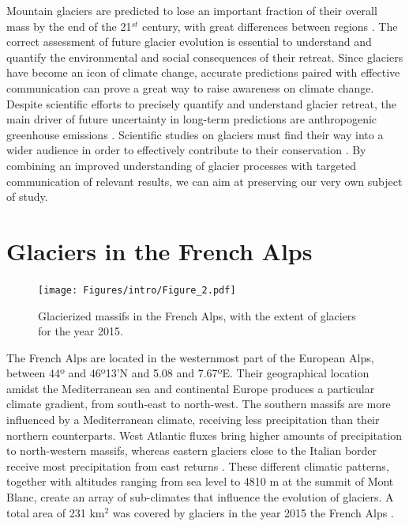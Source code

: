 Mountain glaciers are predicted to lose an important fraction of their overall mass by the end of the 21$^{st}$ century, with great differences between regions \citep{hock_glaciermip_2019}. The correct assessment of future glacier evolution is essential to understand and quantify the environmental and social consequences of their retreat. Since glaciers have become an icon of climate change, accurate predictions paired with effective communication can prove a great way to raise awareness on climate change. Despite scientific efforts to precisely quantify and understand glacier retreat, the main driver of future uncertainty in long-term predictions are anthropogenic greenhouse emissions \citep{marzeion_partitioning_2020}. Scientific studies on glaciers must find their way into a wider audience in order to effectively contribute to their conservation \citep{moser_communicating_2010}. By combining an improved understanding of glacier processes with targeted communication of relevant results, we can aim at preserving our very own subject of study.  

\section{Glaciers in the French Alps}

\begin{figure}
\centering
\texttt{[image: Figures/intro/Figure\_2.pdf]}
\caption{Glacierized massifs in the French Alps, with the extent of glaciers for the year 2015.}
\label{intro:fig2}
\end{figure}

The French Alps are located in the westernmost part of the European Alps, between 44º and 46º13'N and 5.08 and 7.67ºE. Their geographical location amidst the Mediterranean sea and continental Europe produces a particular climate gradient, from south-east to north-west. The southern massifs are more influenced by a Mediterranean climate, receiving less precipitation than their northern counterparts. West Atlantic fluxes bring higher amounts of precipitation to north-western massifs, whereas eastern glaciers close to the Italian border receive most precipitation from east returns \citep{durand_reanalysis_2009}. These different climatic patterns, together with altitudes ranging from sea level to 4810 m at the summit of Mont Blanc, create an array of sub-climates that influence the evolution of glaciers. A total area of 231 km$^{2}$ was covered by glaciers in the year 2015 the French Alps \citep[with 2015 update]{gardent_multitemporal_2014}.


